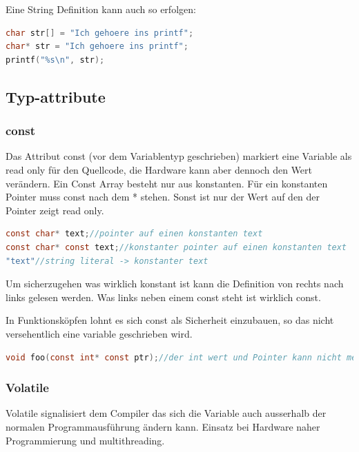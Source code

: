 Eine String Definition kann auch so erfolgen:
\begin{lstlisting}[language = c]
char str[] = "Ich gehoere ins printf";
char* str = "Ich gehoere ins printf";
printf("%s\n", str);
\end{lstlisting}

\subsection{Typ-attribute}

\subsubsection{const}

Das Attribut const (vor dem Variablentyp geschrieben) markiert eine Variable als read only für den Quellcode, die Hardware kann aber dennoch den Wert verändern.\newline
Ein Const Array besteht nur aus konstanten.\newline
Für ein konstanten Pointer muss const nach dem * stehen. Sonst ist nur der Wert auf den der Pointer zeigt read only. 

\begin{lstlisting}[language = c]
const char* text;//pointer auf einen konstanten text
const char* const text;//konstanter pointer auf einen konstanten text
"text"//string literal -> konstanter text
\end{lstlisting}

Um sicherzugehen was wirklich konstant ist kann die Definition von rechts nach links gelesen werden. Was links neben einem const steht ist wirklich const.\newline

In Funktionsköpfen lohnt es sich const als Sicherheit einzubauen, so das nicht versehentlich eine variable geschrieben wird.
\begin{lstlisting}[language = c]
void foo(const int* const ptr);//der int wert und Pointer kann nicht mehr versehentlich veraendert werden.
\end{lstlisting}

\subsubsection{Volatile}

Volatile signalisiert dem Compiler das sich die Variable auch ausserhalb der normalen Programmausführung ändern kann. Einsatz bei Hardware naher Programmierung und multithreading.

